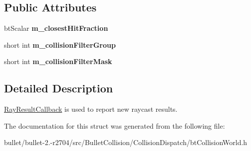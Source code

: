 \subsection*{Public Attributes}
\begin{DoxyCompactItemize}
\item 
\hypertarget{structbt_collision_world_1_1_convex_result_callback_ab40e7dba4b0e8a01de009c36a2ed3781}{bt\+Scalar {\bfseries m\+\_\+closest\+Hit\+Fraction}}\label{structbt_collision_world_1_1_convex_result_callback_ab40e7dba4b0e8a01de009c36a2ed3781}

\item 
\hypertarget{structbt_collision_world_1_1_convex_result_callback_a0c8c9e892543f594a8f1779d173b7418}{short int {\bfseries m\+\_\+collision\+Filter\+Group}}\label{structbt_collision_world_1_1_convex_result_callback_a0c8c9e892543f594a8f1779d173b7418}

\item 
\hypertarget{structbt_collision_world_1_1_convex_result_callback_a0a37298dcedaa71458848f151d0642b3}{short int {\bfseries m\+\_\+collision\+Filter\+Mask}}\label{structbt_collision_world_1_1_convex_result_callback_a0a37298dcedaa71458848f151d0642b3}

\end{DoxyCompactItemize}


\subsection{Detailed Description}
\hyperlink{structbt_collision_world_1_1_ray_result_callback}{Ray\+Result\+Callback} is used to report new raycast results. 

The documentation for this struct was generated from the following file\+:\begin{DoxyCompactItemize}
\item 
bullet/bullet-\/2.-\/r2704/src/\+Bullet\+Collision/\+Collision\+Dispatch/bt\+Collision\+World.\+h\end{DoxyCompactItemize}
